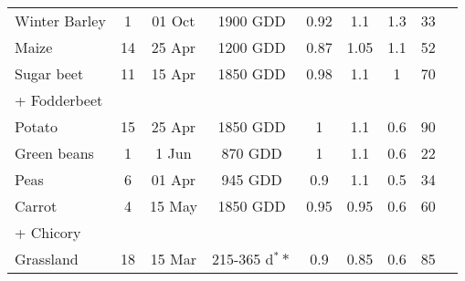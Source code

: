\begin{landscape}
\begin{table}[htbp]
{\begin{threeparttable}
\begin{tabular}{lrrrrrrrr}
Winter Barley  & \multicolumn{1}{c}{1} & \multicolumn{1}{c}{01 Oct} & \multicolumn{1}{c}{1900 GDD} & \multicolumn{1}{c}{0.92} & \multicolumn{1}{c}{1.1} & \multicolumn{1}{c}{1.3} & \multicolumn{1}{c}{33} & \multicolumn{1}{c}{\parencite{abrha2012, vanuytrecht2013}} \\
Maize  & \multicolumn{1}{c}{14} & \multicolumn{1}{c}{25 Apr} & \multicolumn{1}{c}{1200 GDD} & \multicolumn{1}{c}{0.87} & \multicolumn{1}{c}{1.05} & \multicolumn{1}{c}{1.1} & \multicolumn{1}{c}{52} & \multicolumn{1}{c}{\parencite{vanuytrecht2015,vanuytrecht2014}} \\
Sugar beet & \multicolumn{1}{c}{11} & \multicolumn{1}{c}{15 Apr} & \multicolumn{1}{c}{1850 GDD} & \multicolumn{1}{c}{0.98} & \multicolumn{1}{c}{1.1} & \multicolumn{1}{c}{1} & \multicolumn{1}{c}{70} & \multicolumn{1}{c}{\parencite{vanuytrecht2015}} \\
      + Fodderbeet &       &       &       &       &       &       &       &  \\
Potato & \multicolumn{1}{c}{15} & \multicolumn{1}{c}{25 Apr} & \multicolumn{1}{c}{1850 GDD} & \multicolumn{1}{c}{1} & \multicolumn{1}{c}{1.1} & \multicolumn{1}{c}{0.6} & \multicolumn{1}{c}{90} & \multicolumn{1}{c}{\parencite{vanuytrecht2015}} \\
Green beans & \multicolumn{1}{c}{1} & \multicolumn{1}{c}{1 Jun} & \multicolumn{1}{c}{870 GDD} & \multicolumn{1}{c}{1} & \multicolumn{1}{c}{1.1} & \multicolumn{1}{c}{0.6} & \multicolumn{1}{c}{22} & \multicolumn{1}{c}{\parencite{vanuytrecht2013}} \\
Peas  & \multicolumn{1}{c}{6} & \multicolumn{1}{c}{01 Apr} & \multicolumn{1}{c}{945 GDD} & \multicolumn{1}{c}{0.9} & \multicolumn{1}{c}{1.1} & \multicolumn{1}{c}{0.5} & \multicolumn{1}{c}{34} & \multicolumn{1}{c}{\parencite{paredes2013}} \\
Carrot & \multicolumn{1}{c}{4} & \multicolumn{1}{c}{15 May} & \multicolumn{1}{c}{1850 GDD} & \multicolumn{1}{c}{0.95} & \multicolumn{1}{c}{0.95} & \multicolumn{1}{c}{0.6} & \multicolumn{1}{c}{60} & \multicolumn{1}{c}{\parencite{allen1998,vanuytrecht2013}} \\
      + Chicory &       &       &       &       &       &       &       &  \\
Grassland & \multicolumn{1}{c}{18} & \multicolumn{1}{c}{15 Mar} & \multicolumn{1}{c}{215-365 \si{d}$^\ast\ast$} & \multicolumn{1}{c}{0.9} & \multicolumn{1}{c}{0.85} & \multicolumn{1}{c}{0.6} & \multicolumn{1}{c}{85} & \multicolumn{1}{c}{\parencite{allen1998}} \\

\end{tabular}
\end{threeparttable}}
\end{table}
\end{landscape}
